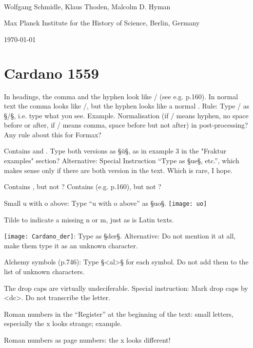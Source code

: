 \documentclass[fontsize=11pt, paper=a4, 
DIV15,
normalheadings,
parskip=half-, 
pointlessnumbers]{scrartcl}
\begin{document}
\begin{center}
{} \\[5mm]
\large Wolfgang Schmidle, Klaus Thoden, Malcolm D. Hyman

\normalsize Max Planck Institute for the History of Science, Berlin, Germany

\today
\end{center}


\section{Cardano 1559}

In headings, the comma and the hyphen look like / (see e.g. p.160). In normal text the comma looks like /, but the hyphen looks like a normal \fraktur{-}. Rule: Type / as §/§, i.e. type what you see. Example. Normalisation (if / means hyphen, no space before or after, if / means comma, space before but not after) in post-processing? Any rule about this for Formax?

Contains  and . Type both versions as §ü§, as in example 3 in the "Fraktur examples" section? Alternative: Special Instruction “Type  as §{ue}§, etc.”, which makes sense only if there are both version in the text. Which is rare, I hope.

Contains  , but not  ? Contains  (e.g. p.160), but not  ?  

Small u with o above: Type “u with o above” as §{uo}§.
\texttt{[image: uo]}

Tilde to indicate a missing n or m, just as is Latin texts.

\texttt{[image: Cardano\_der]}: Type as §{der}§. Alternative: Do not mention it at all, make them type it as an unknown character.

Alchemy symbols (p.746): Type §<al>§ for each symbol. Do not add them to the list of unknown characters.

The drop caps are virtually undeciferable. Special instruction: Mark drop caps by <dc>. Do not transcribe the letter.

Roman numbers in the “Register” at the beginning of the text: small letters, especially the x looks strange; example.

Roman numbers as page numbers: the x looks different!
\end{document}
